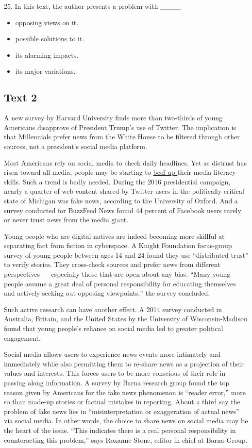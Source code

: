 \documentclass[UTF8,11pt]{ctexart}
\begin{document}
25. In this text, the author presents a problem with \_\_\_\_


\begin{itemize}[leftmargin=2em,itemsep=.2em,topsep=.4em]\item[A.] opposing views on it.
\item[B.] possible solutions to it.
\item[C.] its alarming impacts.
\item[D.] its major variations.
\end{itemize}

\subsection*{\textbf{Text 2}}


A new survey by Harvard University finds more than two-thirds of young Americans disapprove of President Trump’s use of Twitter. The implication is that Millennials prefer news from the White House to be filtered through other sources, not a president’s social media platform.


Most Americans rely on social media to check daily headlines. Yet as distrust has risen toward all media, people may be starting to \uline{beef up }their media literacy skills. Such a trend is badly needed. During the 2016 presidential campaign, nearly a quarter of web content shared by Twitter users in the politically critical state of Michigan was fake news, according to the University of Oxford. And a survey conducted for BuzzFeed News found 44 percent of Facebook users rarely or never trust news from the media giant.


Young people who are digital natives are indeed becoming more skillful at separating fact from fiction in cyberspace. A Knight Foundation focus-group survey of young people between ages 14 and 24 found they use “distributed trust” to verify stories. They cross-check sources and prefer news from different perspectives — especially those that are open about any bias. “Many young people assume a great deal of personal responsibility for educating themselves and actively seeking out opposing viewpoints,” the survey concluded.


Such active research can have another effect. A 2014 survey conducted in Australia, Britain, and the United States by the University of Wisconsin-Madison found that young people’s reliance on social media led to greater political engagement.


Social media allows users to experience news events more intimately and immediately while also permitting them to re-share news as a projection of their values and interests. This forces users to be more conscious of their role in passing along information. A survey by Barna research group found the top reason given by Americans for the fake news phenomenon is “reader error,” more so than made-up stories or factual mistakes in reporting. About a third say the problem of fake news lies in “misinterpretation or exaggeration of actual news” via social media. In other words, the choice to share news on social media may be the heart of the issue. “This indicates there is a real personal responsibility in counteracting this problem,” says Roxanne Stone, editor in chief at Barna Group.
\end{document}
